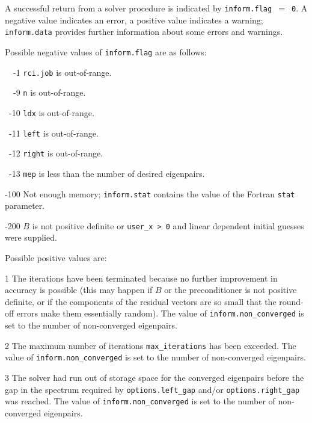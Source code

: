 \label{ssmfe:errors}

A successful return from 
a solver procedure
is indicated 
by {\tt inform.flag $=$ 0}.
A negative value indicates an error, a positive value indicates a warning;
{\tt inform.data} provides further information
about some errors and warnings. 

\noindent
Possible negative values of {\tt inform.flag}
are as follows:
%
\begin{description}
%
\item{~~-1}
\hskip 9pt
{\tt rci.job}  is out-of-range.
%
\item{~~-9}
\hskip 7pt
{\tt n} is out-of-range.
%
\item{~-10}
\hskip 7pt
{\tt ldx} is out-of-range.
%
\item{~-11}
\hskip 7pt
{\tt left} is out-of-range.
%
\item{~-12}
\hskip 7pt
{\tt right} is out-of-range.
%
\item{~-13}
\hskip 7pt
{\tt mep} is less than 
the number of desired eigenpairs.
%
\item{-100}
\hskip 4pt
Not enough memory;
{\tt inform.stat} contains the value of the Fortran {\tt stat} parameter.
%
\item{-200}
\hskip 4pt
$B$ is not positive definite or {\tt user\_x > 0} and
linear dependent initial guesses were supplied.
%
\end{description}

\noindent
Possible positive values  are: 
%
\begin{description}
\item{1}
\hskip 9pt
The iterations have been terminated because no further improvement
in accuracy is possible (this may happen if $B$ or the preconditioner is
not positive definite, or if the components of the residual vectors
are so small that the round-off
errors make them essentially random).
The value of {\tt inform.non\_converged} is set to the number
of non-converged eigenpairs.
\item{2}
\hskip 9pt
The maximum number of iterations {\tt max\_iterations} has been exceeded.
The value of {\tt inform.non\_converged} is set to the number
of non-converged eigenpairs.
\item{3}
\hskip 9pt
The solver had run
out of storage space for the converged eigenpairs
before the gap in the spectrum 
required by {\tt options.left\_gap} and/or {\tt options.right\_gap}
was reached.
The value of {\tt inform.non\_converged} is set to the number
of non-converged eigenpairs.
%
\end{description}

